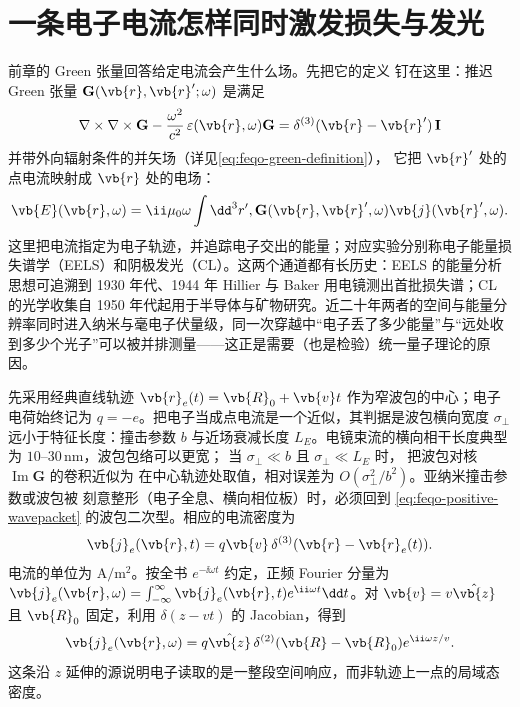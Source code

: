 \section{一条电子电流怎样同时激发损失与发光}
\label{chap:feqo-eels-cl-kernel}

前章的 Green 张量回答给定电流会产生什么场。先把它的定义
钉在这里：推迟 Green 张量 \(\mathbf G(\vb{r},\vb{r}';\omega)\)
是满足
\[
\nabla\times\nabla\times\mathbf G
-\frac{\omega^2}{c^2}\,\varepsilon(\vb{r},\omega)\mathbf G
=\delta^{(3)}(\vb{r}-\vb{r}')\,\mathbf I
\]
并带外向辐射条件的并矢场（详见\cref{eq:feqo-green-definition}），
它把 \(\vb{r}'\) 处的点电流映射成 \(\vb{r}\) 处的电场：
\[
\vb{E}(\vb{r},\omega)
=\ii\mu_0\omega\int\dd^3r', 
\mathbf G(\vb{r},\vb{r}',\omega)\vb{j}(\vb{r}',\omega).
\]
这里把电流指定为电子轨迹，并追踪电子交出的能量；对应实验分别称电子能量损失谱学（EELS）和阴极发光（CL）。这两个通道都有长历史：EELS 的能量分析思想可追溯到 1930 年代、1944 年 Hillier 与 Baker 用电镜测出首批损失谱；CL 的光学收集自 1950 年代起用于半导体与矿物研究。近二十年两者的空间与能量分辨率同时进入纳米与毫电子伏量级，同一次穿越中“电子丢了多少能量”与“远处收到多少个光子”可以被并排测量——这正是需要（也是检验）统一量子理论的原因。

先采用经典直线轨迹 \(\vb{r}_e(t)=\vb{R}_0+\vb{v}t\) 作为窄波包的中心；电子电荷始终记为 \(q=-e\)。把电子当成点电流是一个近似，其判据是波包横向宽度
\(\sigma_\perp\) 远小于特征长度：撞击参数 \(b\)
与近场衰减长度 \(L_E\)。电镜束流的横向相干长度典型为
\(10\)--\(30\,\si{\nano\metre}\)，波包包络可以更宽；
当 \(\sigma_\perp\ll b\) 且 \(\sigma_\perp\ll L_E\) 时，
把波包对核 \(\operatorname{Im}\mathbf G\) 的卷积近似为
在中心轨迹处取值，相对误差为
\(O(\sigma_\perp^2/b^2)\)。亚纳米撞击参数或波包被
刻意整形（电子全息、横向相位板）时，必须回到
\cref{eq:feqo-positive-wavepacket} 的波包二次型。相应的电流密度为
\begin{equation}
\vb{j}_e(\vb{r},t)=q\vb{v}\,\delta^{(3)}(\vb{r}-\vb{r}_e(t)).
\label{eq:feqo-electron-current}
\end{equation}
电流的单位为 \(\si{\ampere\per\square\metre}\)。按全书 \(e^{-\ii\omega t}\) 约定，正频 Fourier 分量为 \(\vb{j}_e(\vb{r},\omega)=\int_{-\infty}^{\infty}\vb{j}_e(\vb{r},t)e^{\ii\omega t}\dd t\)。对 \(\vb{v}=v\hat{\vb{z}}\) 且 \(\vb{R}_0\) 固定，利用 \(\delta(z-vt)\) 的 Jacobian，得到
\[
\vb{j}_e(\vb{r},\omega)=q\hat{\vb{z}}\,
\delta^{(2)}(\vb{R}-\vb{R}_0)e^{\ii\omega z/v}.
\]
这条沿 \(z\) 延伸的源说明电子读取的是一整段空间响应，而非轨迹上一点的局域态密度。

